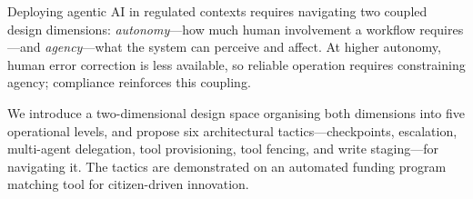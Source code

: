 Deploying agentic AI in regulated contexts requires navigating two coupled design dimensions: \emph{autonomy}---how much human involvement a workflow requires---and \emph{agency}---what the system can perceive and affect. At higher autonomy, human error correction is less available, so reliable operation requires constraining agency; compliance reinforces this coupling.

We introduce a two-dimensional design space organising both dimensions into five operational levels, and propose six architectural tactics---checkpoints, escalation, multi-agent delegation, tool provisioning, tool fencing, and write staging---for navigating it. The tactics are demonstrated on an automated funding program matching tool for citizen-driven innovation.

